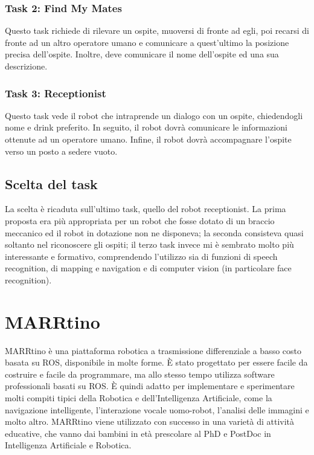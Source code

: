 \documentclass[italian, twoside]{sapthesis} %
\begin{document}
\subsection{Task 2: Find My Mates}
Questo task richiede di rilevare un ospite, muoversi di fronte ad egli, poi recarsi di fronte ad un altro operatore umano e comunicare a quest'ultimo la posizione precisa dell'ospite. Inoltre, deve comunicare il nome dell'ospite ed una sua descrizione.

\subsection{Task 3: Receptionist}
Questo task vede il robot che intraprende un dialogo con un ospite, chiedendogli nome e drink preferito. In seguito, il robot dovrà comunicare le informazioni ottenute ad un operatore umano. Infine, il robot dovrà accompagnare l'ospite verso un posto a sedere vuoto.

\section{Scelta del task}
La scelta è ricaduta sull'ultimo task, quello del robot receptionist. La prima proposta era più appropriata per un robot che fosse dotato di un braccio meccanico ed il robot in dotazione non ne disponeva; la seconda consisteva quasi soltanto nel riconoscere gli ospiti; il terzo task invece mi è sembrato molto più interessante e formativo, comprendendo l'utilizzo sia di funzioni di speech recognition, di mapping e navigation e di computer vision (in particolare face recognition).

\chapter{MARRtino}
\label{chap:2}
\lettrine[lines=2, findent=3pt, nindent=0pt]{M}{}ARRtino è una piattaforma robotica a trasmissione differenziale a basso costo basata su ROS, disponibile in molte forme. È stato progettato per essere facile da costruire e facile da programmare, ma allo stesso tempo utilizza software professionali basati su ROS. È quindi adatto per implementare e sperimentare molti compiti tipici della Robotica e dell'Intelligenza Artificiale, come la navigazione intelligente, l'interazione vocale uomo-robot, l'analisi delle immagini e molto altro. MARRtino viene utilizzato con successo in una varietà di attività educative, che vanno dai bambini in età prescolare al PhD e PostDoc in Intelligenza Artificiale e Robotica.
\end{document}
